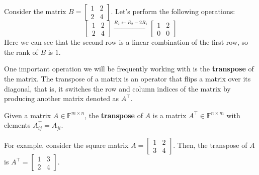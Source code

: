\documentclass[../lecture-notes-148x210.tex]{subfiles}
\begin{document}
\begin{example}
    Consider the matrix $B = \begin{bmatrix} 1 & 2 \\ 2 & 4 \end{bmatrix}$. Let's perform the following operations:
    \begin{equation*}
        \begin{bmatrix} 
            1 & 2 \\ 
            2 & 4 
        \end{bmatrix} 
        \xrightarrow{R_2 \gets R_2 - 2R_1} 
        \begin{bmatrix} 
            1 & 2 \\ 
            0 & 0 
        \end{bmatrix}
    \end{equation*}
    Here we can see that the second row is a linear combination of the first row, so the rank of $B$ is $1$.
\end{example}

One important operation we will be frequently working with is the \textbf{transpose} of the matrix. The transpose of a matrix is an operator that flips a matrix over its diagonal, that is, it switches the row and column indices of the matrix by producing another matrix denoted as $A^{\top}$.

\begin{definition}[Transposition]
    Given a matrix $A \in \mathbb{F}^{m \times n}$, the \textbf{transpose} of $A$ is a matrix $A^{\top} \in \mathbb{F}^{n \times m}$ with elements $A^{\top}_{ij} = A_{ji}$.
\end{definition}

\begin{example}
    For example, consider the square matrix $A = \begin{bmatrix} 1 & 2 \\ 3 & 4 \end{bmatrix}$. 
    Then, the transpose of $A$ is $A^{\top} = \begin{bmatrix} 1 & 3 \\ 2 & 4 \end{bmatrix}$. 
\end{example}
\end{document}
